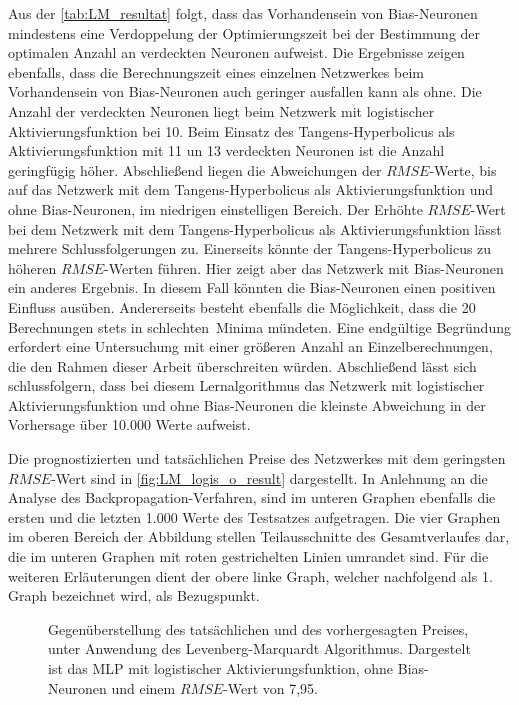 \newpage

Aus der \autoref{tab:LM_resultat} folgt, dass das Vorhandensein von Bias-Neuronen mindestens eine Verdoppelung der Optimierungszeit bei der Bestimmung der optimalen Anzahl an verdeckten Neuronen aufweist. Die Ergebnisse zeigen ebenfalls, dass die Berechnungszeit eines einzelnen Netzwerkes beim Vorhandensein von Bias-Neuronen auch geringer ausfallen kann als ohne. Die Anzahl der verdeckten Neuronen liegt beim Netzwerk mit logistischer Aktivierungsfunktion bei 10. Beim Einsatz des Tangens-Hyperbolicus als Aktivierungsfunktion mit 11 un 13 verdeckten Neuronen ist die Anzahl geringfügig höher. Abschließend liegen die Abweichungen der $RMSE$-Werte, bis auf das Netzwerk mit dem Tangens-Hyperbolicus als Aktivierungsfunktion und ohne Bias-Neuronen, im niedrigen einstelligen Bereich. Der Erhöhte $RMSE$-Wert bei dem Netzwerk mit dem Tangens-Hyperbolicus als Aktivierungsfunktion lässt mehrere Schlussfolgerungen zu. Einerseits könnte der Tangens-Hyperbolicus zu höheren $RMSE$-Werten führen. Hier zeigt aber das Netzwerk mit Bias-Neuronen ein anderes Ergebnis. In diesem Fall könnten die Bias-Neuronen einen positiven Einfluss ausüben. Andererseits besteht ebenfalls die Möglichkeit, dass die 20 Berechnungen stets in \glqq schlechten\grqq~Minima mündeten. Eine endgültige Begründung erfordert eine Untersuchung mit einer größeren Anzahl an Einzelberechnungen, die den Rahmen dieser Arbeit überschreiten würden. Abschließend lässt sich schlussfolgern, dass bei diesem Lernalgorithmus das Netzwerk mit logistischer Aktivierungsfunktion und ohne Bias-Neuronen die kleinste Abweichung in der Vorhersage über 10.000 Werte aufweist.

Die prognostizierten und tatsächlichen Preise des Netzwerkes mit dem geringsten $RMSE$-Wert sind in \autoref{fig:LM_logis_o_result} dargestellt. In Anlehnung an die Analyse des Backpropagation-Verfahren, sind im unteren Graphen ebenfalls die ersten und die letzten 1.000 Werte des Testsatzes aufgetragen. Die vier Graphen im oberen Bereich der Abbildung stellen Teilausschnitte des Gesamtverlaufes dar, die im unteren Graphen mit roten gestrichelten Linien umrandet sind. Für die weiteren Erläuterungen dient der obere linke Graph, welcher nachfolgend als 1. Graph bezeichnet wird, als Bezugspunkt.

\begin{figure}[!htb]
    \centering
        
    \caption[Gegenüberstellung des tatsächlichen und des vorhergesagten Preises beim LM]{Gegenüberstellung des tatsächlichen und des vorhergesagten Preises, unter Anwendung des Levenberg-Marquardt Algorithmus. Dargestelt ist das MLP mit logistischer Aktivierungsfunktion, ohne Bias-Neuronen und einem $RMSE$-Wert von 7,95.}
    \label{fig:LM_logis_o_result}
\end{figure}

